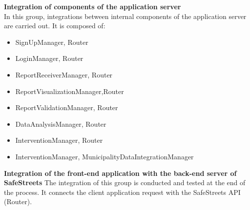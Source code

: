 \textbf{Integration of components of the application server}\\
In this group, integrations between internal components of the application server are carried out. It is composed of:
\begin{itemize}
	\item SignUpManager, Router
	\item LoginManager, Router
	\item ReportReceiverManager, Router
	\item ReportVisualizationManager,Router
	\item ReportValidationManager, Router
	\item DataAnalysisManager, Router
	\item InterventionManager, Router
	\item InterventionManager, MunicipalityDataIntegrationManager
\end{itemize}
\textbf{Integration of the front-end application with the back-end server of SafeStreets}
The integration of this group is conducted and tested at the end of the process. It connects the client application request with the SafeStreets API (Router).
